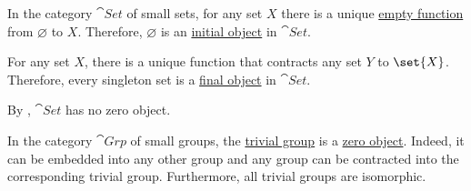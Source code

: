 \begin{example}\label{ex:def:zero_objects}
  In the category \hyperref[def:category_of_small_sets]{\( \cat{Set} \)} of small sets, for any set \( X \) there is a unique \hyperref[def:multi_valued_function/empty]{empty function} from \( \varnothing \) to \( X \). Therefore, \( \varnothing \) is an \hyperref[def:zero_objects/initial]{initial object} in \( \cat{Set} \).

  For any set \( X \), there is a unique function that contracts any set \( Y \) to \( \set{ X } \). Therefore, every singleton set is a \hyperref[def:zero_objects/final]{final object} in \( \cat{Set} \).

  By , \( \cat{Set} \) has no zero object.

  In the category \hyperref[def:group/category]{\( \cat{Grp} \)} of small groups, the \hyperref[def:group/trivial]{trivial group} is a \hyperref[def:zero_objects/zero]{zero object}. Indeed, it can be embedded into any other group and any group can be contracted into the corresponding trivial group. Furthermore, all trivial groups are isomorphic.
\end{example}

